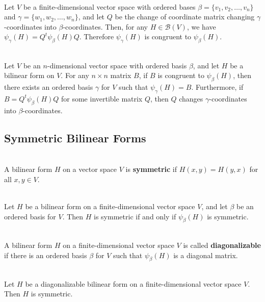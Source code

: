 \begin{theorem}
	\hfill\\
	Let $V$ be a finite-dimensional vector space with ordered bases $\beta = \{v_1, v_2, \dots, v_n\}$ and $\gamma = \{w_1, w_2, \dots, w_n\}$, and let $Q$ be the change of coordinate matrix changing $\gamma$-coordinates into $\beta$-coordinates. Then, for any $H \in \mathcal{B}(V)$, we have $\psi_\gamma(H) = Q^t\psi_\beta(H)Q$. Therefore $\psi_\gamma(H)$ is congruent to $\psi_\beta(H)$.
\end{theorem}

\begin{corollary}
	\hfill\\
	Let $V$ be an $n$-dimensional vector space with ordered basis $\beta$, and let $H$ be a bilinear form on $V$. For any $n \times n$ matrix $B$, if $B$ is congruent to $\psi_\beta(H)$, then there exists an ordered basis $\gamma$ for $V$ such that $\psi_\gamma(H) = B$. Furthermore, if $B = Q^t\psi_\beta(H)Q$ for some invertible matrix $Q$, then $Q$ changes $\gamma$-coordinates into $\beta$-coordinates.
\end{corollary}

\subsection*{Symmetric Bilinear Forms}

\begin{definition}
	\hfill\\
	A bilinear form $H$ on a vector space $V$ is \textbf{symmetric} if $H(x,y) = H(y,x)$ for all $x,y \in V$.
\end{definition}

\begin{theorem}
	\hfill\\
	Let $H$ be a bilinear form on a finite-dimensional vector space $V$, and let $\beta$ be an ordered basis for $V$. Then $H$ is symmetric if and only if $\psi_\beta(H)$ is symmetric.
\end{theorem}

\begin{definition}
	\hfill\\
	A bilinear form $H$ on a finite-dimensional vector space $V$ is called \textbf{diagonalizable} if there is an ordered basis $\beta$ for $V$ such that $\psi_\beta(H)$ is a diagonal matrix.
\end{definition}

\begin{corollary}
	\hfill\\
	Let $H$ be a diagonalizable bilinear form on a finite-dimensional vector space $V$. Then $H$ is symmetric.
\end{corollary}

